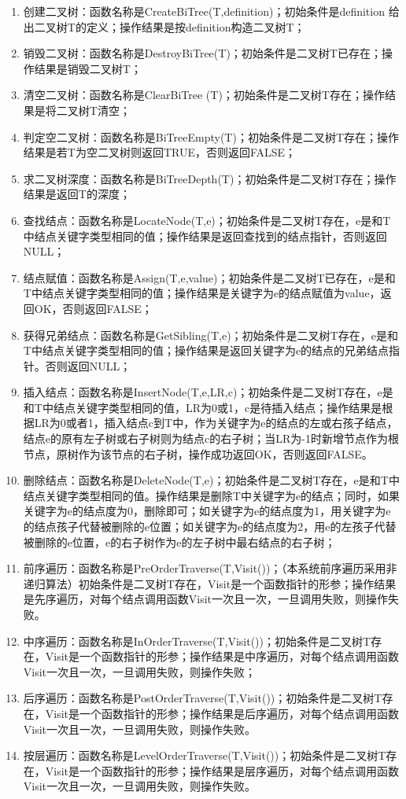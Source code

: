 \documentclass[supercite]{Experimental_Report}
\theoremstyle{definition}
\begin{document}
\begin{enumerate}
    \item 创建二叉树：函数名称是CreateBiTree(T,definition)；初始条件是definition 给出二叉树T的定义；操作结果是按definition构造二叉树T；
    \item 销毁二叉树：函数名称是DestroyBiTree(T)；初始条件是二叉树T已存在；操作结果是销毁二叉树T；
    \item 清空二叉树：函数名称是ClearBiTree (T)；初始条件是二叉树T存在；操作结果是将二叉树T清空；
    \item 判定空二叉树：函数名称是BiTreeEmpty(T)；初始条件是二叉树T存在；操作结果是若T为空二叉树则返回TRUE，否则返回FALSE；
    \item 求二叉树深度：函数名称是BiTreeDepth(T)；初始条件是二叉树T存在；操作结果是返回T的深度；
    \item 查找结点：函数名称是LocateNode(T,e)；初始条件是二叉树T存在，e是和T中结点关键字类型相同的值；操作结果是返回查找到的结点指针，否则返回NULL；
    \item 结点赋值：函数名称是Assign(T,e,value)；初始条件是二叉树T已存在，e是和T中结点关键字类型相同的值；操作结果是关键字为e的结点赋值为value，返回OK，否则返回FALSE；
	\item 获得兄弟结点：函数名称是GetSibling(T,e)；初始条件是二叉树T存在，e是和T中结点关键字类型相同的值；操作结果是返回关键字为e的结点的兄弟结点指针。否则返回NULL；
	\item 插入结点：函数名称是InsertNode(T,e,LR,c)；初始条件是二叉树T存在，e是和T中结点关键字类型相同的值，LR为0或1，c是待插入结点；操作结果是根据LR为0或者1，插入结点c到T中，作为关键字为e的结点的左或右孩子结点，结点e的原有左子树或右子树则为结点c的右子树；当LR为-1时新增节点作为根节点，原树作为该节点的右子树，操作成功返回OK，否则返回FALSE。
	\item 删除结点：函数名称是DeleteNode(T,e)；初始条件是二叉树T存在，e是和T中结点关键字类型相同的值。操作结果是删除T中关键字为e的结点；同时，如果关键字为e的结点度为0，删除即可；如关键字为e的结点度为1，用关键字为e的结点孩子代替被删除的e位置；如关键字为e的结点度为2，用e的左孩子代替被删除的e位置，e的右子树作为e的左子树中最右结点的右子树；
	\item 前序遍历：函数名称是PreOrderTraverse(T,Visit())；（本系统前序遍历采用非递归算法）初始条件是二叉树T存在，Visit是一个函数指针的形参；操作结果是先序遍历，对每个结点调用函数Visit一次且一次，一旦调用失败，则操作失败。
	\item 中序遍历：函数名称是InOrderTraverse(T,Visit())；初始条件是二叉树T存在，Visit是一个函数指针的形参；操作结果是中序遍历，对每个结点调用函数Visit一次且一次，一旦调用失败，则操作失败；
	\item 后序遍历：函数名称是PostOrderTraverse(T,Visit())；初始条件是二叉树T存在，Visit是一个函数指针的形参；操作结果是后序遍历，对每个结点调用函数Visit一次且一次，一旦调用失败，则操作失败。
	\item 按层遍历：函数名称是LevelOrderTraverse(T,Visit())；初始条件是二叉树T存在，Visit是一个函数指针的形参；操作结果是层序遍历，对每个结点调用函数Visit一次且一次，一旦调用失败，则操作失败。
\end{enumerate}
\end{document}
